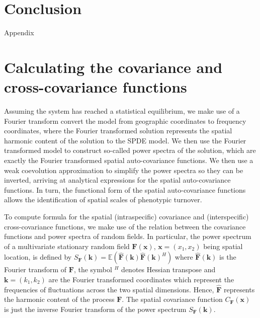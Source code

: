 \documentclass{article}
\begin{document}
\hypertarget{conclusion}{%
\section{Conclusion}\label{conclusion}}

\newpage

\appendix

\begin{center}
\Large{Appendix}
\end{center}

\hypertarget{calculating-the-covariance-and-cross-covariance-functions}{%
\section{\texorpdfstring{Calculating the covariance and cross-covariance
functions
\label{spde-app}}{Calculating the covariance and cross-covariance functions }}\label{calculating-the-covariance-and-cross-covariance-functions}}

Assuming the system has reached a statistical equilibrium, we make use
of a Fourier transform convert the model from geographic coordinates to
frequency coordinates, where the Fourier transformed solution represents
the spatial harmonic content of the solution to the SPDE model. We then
use the Fourier transformed model to construct so-called power spectra
of the solution, which are exactly the Fourier transformed spatial
auto-covariance functions. We then use a weak coevolution approximation
to simplify the power spectra so they can be inverted, arriving at
analytical expressions for the spatial auto-covariance functions. In
turn, the functional form of the spatial auto-covariance functions
allows the identification of spatial scales of phenotypic turnover.

To compute formula for the spatial (intraspecific) covariance and
(interspecific) cross-covariance functions, we make use of the relation
between the covariance functions and power spectra of random fields. In
particular, the power spectrum of a multivariate stationary random field
\(\pmb F(\pmb x)\), \(\pmb x=(x_1,x_2)\) being spatial location, is
defined by
\(S_{\pmb F}(\pmb k)=\mathbb E\left(\hat{\pmb F}(\pmb k)\hat{\pmb F}(\pmb k)^H\right)\)
where \(\hat{\pmb F}(\pmb k)\) is the Fourier transform of \(\pmb F\),
the symbol \(^H\) denotes Hessian transpose and \(\pmb k=(k_1,k_2)\) are
the Fourier transformed coordinates which represent the frequencies of
fluctuations across the two spatial dimensions. Hence, \(\hat{\pmb F}\)
represents the harmonic content of the process \(\pmb F\). The spatial
covariance function \(C_{\pmb F}(\pmb x)\) is just the inverse Fourier
transform of the power spectrum \(S_{\pmb F}(\pmb k)\).
\end{document}
